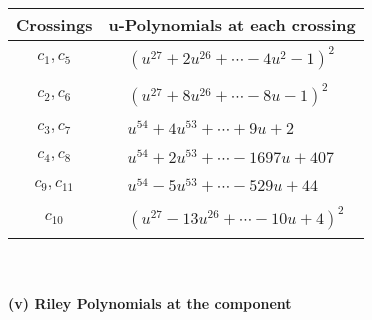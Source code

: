\documentclass[1p]{elsarticle_modified}
\theoremstyle{definition}
\begin{document}
\begin{tabular}{m{50pt}|m{274pt}}
Crossings & \hspace{64pt}u-Polynomials at each crossing \\
\hline $$\begin{aligned}c_{1},c_{5}\end{aligned}$$&$\begin{aligned}
&(u^{27}+2 u^{26}+\cdots-4 u^2-1)^{2}
\end{aligned}$\\
\hline $$\begin{aligned}c_{2},c_{6}\end{aligned}$$&$\begin{aligned}
&(u^{27}+8 u^{26}+\cdots-8 u-1)^{2}
\end{aligned}$\\
\hline $$\begin{aligned}c_{3},c_{7}\end{aligned}$$&$\begin{aligned}
&u^{54}+4 u^{53}+\cdots+9 u+2
\end{aligned}$\\
\hline $$\begin{aligned}c_{4},c_{8}\end{aligned}$$&$\begin{aligned}
&u^{54}+2 u^{53}+\cdots-1697 u+407
\end{aligned}$\\
\hline $$\begin{aligned}c_{9},c_{11}\end{aligned}$$&$\begin{aligned}
&u^{54}-5 u^{53}+\cdots-529 u+44
\end{aligned}$\\
\hline $$\begin{aligned}c_{10}\end{aligned}$$&$\begin{aligned}
&(u^{27}-13 u^{26}+\cdots-10 u+4)^{2}
\end{aligned}$\\
\hline
\end{tabular}\\~\\
\newpage\renewcommand{\arraystretch}{1}
\flushleft \textbf{(v) Riley Polynomials at the component}\newline \\
\end{document}

